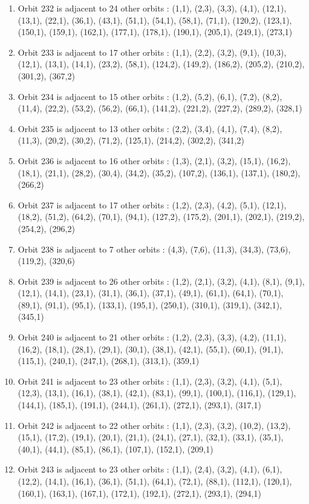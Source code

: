 \documentclass[12pt]{article}
\begin{document}
\begin{enumerate}
\item Orbit 232 is adjacent to 24 other orbits : (1,1), (2,3), (3,3), (4,1), (12,1), (13,1), (22,1), (36,1), (43,1), (51,1), (54,1), (58,1), (71,1), (120,2), (123,1), (150,1), (159,1), (162,1), (177,1), (178,1), (190,1), (205,1), (249,1), (273,1)
\item Orbit 233 is adjacent to 17 other orbits : (1,1), (2,2), (3,2), (9,1), (10,3), (12,1), (13,1), (14,1), (23,2), (58,1), (124,2), (149,2), (186,2), (205,2), (210,2), (301,2), (367,2)
\item Orbit 234 is adjacent to 15 other orbits : (1,2), (5,2), (6,1), (7,2), (8,2), (11,4), (22,2), (53,2), (56,2), (66,1), (141,2), (221,2), (227,2), (289,2), (328,1)
\item Orbit 235 is adjacent to 13 other orbits : (2,2), (3,4), (4,1), (7,4), (8,2), (11,3), (20,2), (30,2), (71,2), (125,1), (214,2), (302,2), (341,2)
\item Orbit 236 is adjacent to 16 other orbits : (1,3), (2,1), (3,2), (15,1), (16,2), (18,1), (21,1), (28,2), (30,4), (34,2), (35,2), (107,2), (136,1), (137,1), (180,2), (266,2)
\item Orbit 237 is adjacent to 17 other orbits : (1,2), (2,3), (4,2), (5,1), (12,1), (18,2), (51,2), (64,2), (70,1), (94,1), (127,2), (175,2), (201,1), (202,1), (219,2), (254,2), (296,2)
\item Orbit 238 is adjacent to 7 other orbits : (4,3), (7,6), (11,3), (34,3), (73,6), (119,2), (320,6)
\item Orbit 239 is adjacent to 26 other orbits : (1,2), (2,1), (3,2), (4,1), (8,1), (9,1), (12,1), (14,1), (23,1), (31,1), (36,1), (37,1), (49,1), (61,1), (64,1), (70,1), (89,1), (91,1), (95,1), (133,1), (195,1), (250,1), (310,1), (319,1), (342,1), (345,1)
\item Orbit 240 is adjacent to 21 other orbits : (1,2), (2,3), (3,3), (4,2), (11,1), (16,2), (18,1), (28,1), (29,1), (30,1), (38,1), (42,1), (55,1), (60,1), (91,1), (115,1), (240,1), (247,1), (268,1), (313,1), (359,1)
\item Orbit 241 is adjacent to 23 other orbits : (1,1), (2,3), (3,2), (4,1), (5,1), (12,3), (13,1), (16,1), (38,1), (42,1), (83,1), (99,1), (100,1), (116,1), (129,1), (144,1), (185,1), (191,1), (244,1), (261,1), (272,1), (293,1), (317,1)
\item Orbit 242 is adjacent to 22 other orbits : (1,1), (2,3), (3,2), (10,2), (13,2), (15,1), (17,2), (19,1), (20,1), (21,1), (24,1), (27,1), (32,1), (33,1), (35,1), (40,1), (44,1), (85,1), (86,1), (107,1), (152,1), (209,1)
\item Orbit 243 is adjacent to 23 other orbits : (1,1), (2,4), (3,2), (4,1), (6,1), (12,2), (14,1), (16,1), (36,1), (51,1), (64,1), (72,1), (88,1), (112,1), (120,1), (160,1), (163,1), (167,1), (172,1), (192,1), (272,1), (293,1), (294,1)

\end{enumerate}
\end{document}
